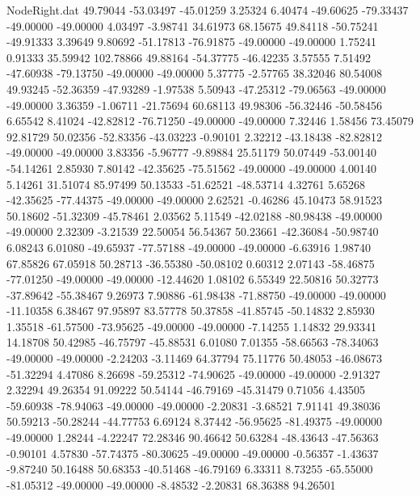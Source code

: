 \begin{filecontents}{NodeRight.dat}
  49.79044  -53.03497  -45.01259     3.25324    6.40474  -49.60625  -79.33437  -49.00000  -49.00000    4.03497   -3.98741   34.61973   68.15675
  49.84118  -50.75241  -49.91333     3.39649    9.80692  -51.17813  -76.91875  -49.00000  -49.00000    1.75241    0.91333   35.59942  102.78866
  49.88164  -54.37775  -46.42235     3.57555    7.51492  -47.60938  -79.13750  -49.00000  -49.00000    5.37775   -2.57765   38.32046   80.54008
  49.93245  -52.36359  -47.93289    -1.97538    5.50943  -47.25312  -79.06563  -49.00000  -49.00000    3.36359   -1.06711  -21.75694   60.68113
  49.98306  -56.32446  -50.58456     6.65542    8.41024  -42.82812  -76.71250  -49.00000  -49.00000    7.32446    1.58456   73.45079   92.81729
  50.02356  -52.83356  -43.03223    -0.90101    2.32212  -43.18438  -82.82812  -49.00000  -49.00000    3.83356   -5.96777   -9.89884   25.51179
  50.07449  -53.00140  -54.14261     2.85930    7.80142  -42.35625  -75.51562  -49.00000  -49.00000    4.00140    5.14261   31.51074   85.97499
  50.13533  -51.62521  -48.53714     4.32761    5.65268  -42.35625  -77.44375  -49.00000  -49.00000    2.62521   -0.46286   45.10473   58.91523
  50.18602  -51.32309  -45.78461     2.03562    5.11549  -42.02188  -80.98438  -49.00000  -49.00000    2.32309   -3.21539   22.50054   56.54367
  50.23661  -42.36084  -50.98740     6.08243    6.01080  -49.65937  -77.57188  -49.00000  -49.00000   -6.63916    1.98740   67.85826   67.05918
  50.28713  -36.55380  -50.08102     0.60312    2.07143  -58.46875  -77.01250  -49.00000  -49.00000  -12.44620    1.08102    6.55349   22.50816
  50.32773  -37.89642  -55.38467     9.26973    7.90886  -61.98438  -71.88750  -49.00000  -49.00000  -11.10358    6.38467   97.95897   83.57778
  50.37858  -41.85745  -50.14832     2.85930    1.35518  -61.57500  -73.95625  -49.00000  -49.00000   -7.14255    1.14832   29.93341   14.18708
  50.42985  -46.75797  -45.88531     6.01080    7.01355  -58.66563  -78.34063  -49.00000  -49.00000   -2.24203   -3.11469   64.37794   75.11776
  50.48053  -46.08673  -51.32294     4.47086    8.26698  -59.25312  -74.90625  -49.00000  -49.00000   -2.91327    2.32294   49.26354   91.09222
  50.54144  -46.79169  -45.31479     0.71056    4.43505  -59.60938  -78.94063  -49.00000  -49.00000   -2.20831   -3.68521    7.91141   49.38036
  50.59213  -50.28244  -44.77753     6.69124    8.37442  -56.95625  -81.49375  -49.00000  -49.00000    1.28244   -4.22247   72.28346   90.46642
  50.63284  -48.43643  -47.56363    -0.90101    4.57830  -57.74375  -80.30625  -49.00000  -49.00000   -0.56357   -1.43637   -9.87240   50.16488
  50.68353  -40.51468  -46.79169     6.33311    8.73255  -65.55000  -81.05312  -49.00000  -49.00000   -8.48532   -2.20831   68.36388   94.26501

\end{filecontents}
